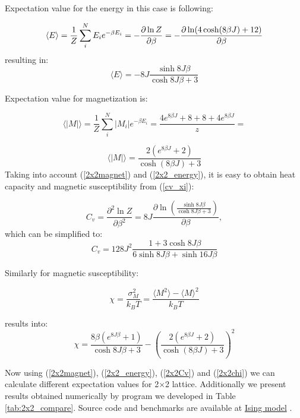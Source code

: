 \documentclass[10pt]{article}
\begin{document}
Expectation value for the energy in this case is following:

\[
\langle E\rangle =\frac{1}{Z}\sum_{i}^{N}E_{i}e^{-\beta E_{i}}=-\frac{%
\partial \ln Z}{\partial \beta }=-\frac{\partial \ln (4\cosh (8\beta J)+12)}{%
\partial \beta }
\]
resulting in:
\begin{equation}\label{2x2_energy}
\langle E\rangle=-8J\frac{\sinh 8J\beta }{\cosh 8J\beta +3}
\end{equation}

Expectation value for magnetization is:

\[
\langle \left\vert M\right\vert \rangle =\frac{1}{Z}\sum_{i}^{N}\left\vert
M_{i}\right\vert e^{-\beta E_{i}}=\frac{4e^{8\beta J}+8+8+4e^{8\beta J}}{z}=%
\]

\begin{equation}\label{2x2magnet}
\langle \left\vert M\right\vert \rangle=\frac{2(e^{8\beta J}+2)}{\cosh (8\beta J)+3}
\end{equation}
Taking into account (\ref{2x2magnet}) and (\ref{2x2_energy}), it is easy to obtain heat capacity and
magnetic susceptibility from (\ref{cv_xi}):

\[
C_{v}=\frac{\partial ^{2}\ln Z}{\partial\beta ^{2}}=8J\frac{\partial \ln (\frac{\sinh 8J\beta }{\cosh 8J\beta +3})}{\partial \beta },
\]
which can be simplified to:
\begin{equation}\label{2x2Cv}
C_{v}=128J^{2}\frac{1+3\cosh 8J\beta }{6\sinh 8J\beta +\sinh 16J\beta }
\end{equation}

Similarly for magnetic susceptibility:

\[
\chi=\frac{\sigma^2 _{M}}{k_{B}T}=\frac{\langle M^{2}\rangle -\langle M\rangle ^{2}}{k_{B}T}
\]

results into:
\begin{equation}\label{2x2chi}
\chi=\frac{8\beta (e^{8J\beta }+1)}{\cosh 8J\beta +3}-\left( \frac{2(e^{8\beta J}+2)}{\cosh (8\beta J)+3}\right) ^{2}
\end{equation}

Now using (\ref{2x2magnet}), (\ref{2x2_energy}), (\ref{2x2Cv}) and (\ref{2x2chi}) we can calculate different expectation values for 2$\times$2 lattice. Additionally we present results obtained numerically by program we developed in Table \ref{tab:2x2_compare}. Source code and benchmarks are available at 
\href{https://github.com/andrei-fys/fys4150/tree/master/Project_4/src/task_b_c}{Ising model} .
\end{document}
